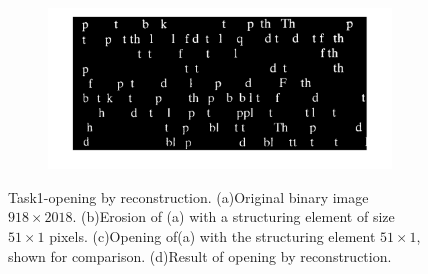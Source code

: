 \begin{figure}[h!]
	\begin{subfigure}[b]{0.45\linewidth}
    	\includegraphics[width=\linewidth]{myfigure/p8/fig0929(d).png}
    	\caption{}
    	\label{fig:0929d}
  	\end{subfigure}
  	\caption{Task1-opening by reconstruction. (a)Original binary image $918 \times 2018$. (b)Erosion of (a) with a structuring element of size $51 \times 1$ pixels. (c)Opening of(a) with the structuring element $51 \times 1$, shown for comparison. (d)Result of opening by reconstruction.}
  	\label{fig:0929}
\end{figure}

